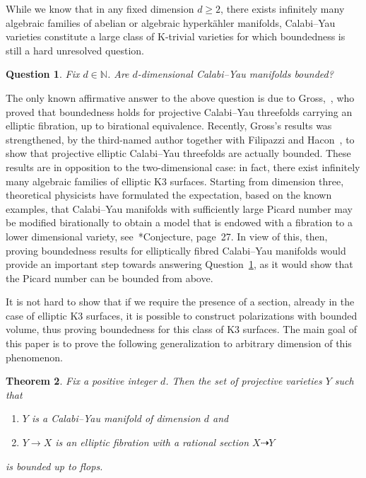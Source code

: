 \documentclass[11pt]{ip-journal}
\newtheorem{theorem}{Theorem}[section]
\newtheorem{question}[theorem]{Question}
\theoremstyle{definition}
\begin{document}
While we know that in any fixed dimension $d\geq 2$, there exists infinitely many algebraic families of abelian or algebraic hyperk\"ahler manifolds, Calabi--Yau varieties constitute a large class of K-trivial varieties for which boundedness is still a hard unresolved question.
\begin{question}
\label{cy.probl}
Fix $d \in \mathbb{N}$. 
Are $d$-dimensional Calabi--Yau manifolds bounded?
\end{question}
\noindent
The only known affirmative answer to the above question is due to Gross,~\cite{MR1272978}, who proved that boundedness holds for projective Calabi--Yau threefolds carrying an elliptic fibration, up to birational equivalence.
Recently, Gross's results was strengthened, by the third-named author together with Filipazzi and Hacon~\cite{2112.01352}, to show that projective elliptic Calabi--Yau threefolds are actually bounded.
These results are in opposition to the two-dimensional case: in fact, there exist infinitely many algebraic families of elliptic K3 surfaces.
Starting from dimension three, theoretical physicists have formulated the expectation, based on the known examples, that Calabi--Yau manifolds with sufficiently large Picard number may be modified birationally to obtain a model that is endowed with a fibration to a lower dimensional variety, see~\cite{Anderson2017}*{Conjecture, page~27}.
In view of this, then, proving boundedness results for elliptically fibred Calabi--Yau manifolds would provide an important step towards answering Question~\ref{cy.probl}, as it would show that the Picard number can be bounded from above.

It is not hard to show that if we require the presence of a section, already in the case of elliptic K3 surfaces, it is possible to construct polarizations with bounded volume, thus proving boundedness for this class of K3 surfaces.
The main goal of this paper is to prove the following generalization to arbitrary dimension of this phenomenon.

\begin{theorem}
\label{ell.cy.thm}
Fix a positive integer $d$.
Then the set of projective varieties $Y$ such that
\begin{enumerate}
    \item $Y$ is a Calabi--Yau manifold of dimension $d$ and
    \item $Y \to X$ is an elliptic fibration with a rational section $X \dashrightarrow Y$
\end{enumerate}
is bounded up to 
flops.
\end{theorem}
\noindent
\end{document}
